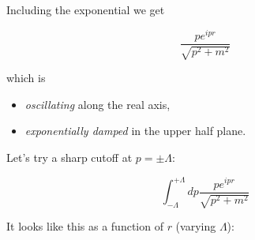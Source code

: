\documentclass{beamer}
\newcommand{\integrand}{\frac{p e^{ipr}}{\sqrt{p^2 + m^2}}}
\begin{document}


\begin{frame}
Including the exponential we get

$$\integrand$$

which is

\begin{itemize}
\item \emph{oscillating} along the real axis,

\item \emph{exponentially damped} in the upper half plane.
\end{itemize}
\end{frame}







\begin{frame}
Let's try a sharp cutoff at $p = \pm \Lambda$:

$$\int_{-\Lambda}^{+\Lambda} dp \integrand$$

It looks like this as a function of $r$ (varying $\Lambda$):
\end{frame}
\end{document}
